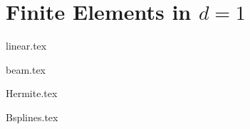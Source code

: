 \chapter{Finite Elements in \texorpdfstring{$d=1$}{d=1}}

{linear.tex}

{beam.tex}

{Hermite.tex}

{Bsplines.tex}

